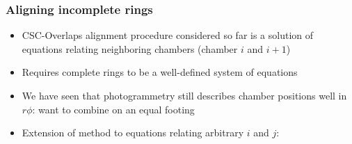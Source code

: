 \documentclass[compress]{beamer}
\begin{document}

\begin{frame}
\frametitle{Aligning incomplete rings}

\begin{itemize}
\item CSC-Overlaps alignment procedure considered so far is a solution of equations relating neighboring chambers (chamber $i$ and $i+1$)
\item Requires complete rings to be a well-defined system of equations
\item We have seen that photogrammetry still describes chamber positions well in $r\phi$: want to combine on an equal footing
\item<2> Extension of method to equations relating arbitrary $i$ and $j$:

\begin{center}
\end{center}
\end{itemize}
\end{frame}
\end{document}
